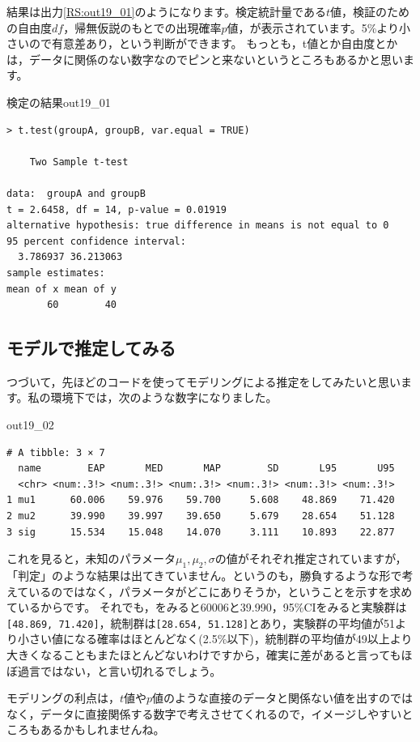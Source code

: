 \documentclass{ltjsbook}
\begin{document}
結果は出力\ref{RS:out19_01}のようになります。検定統計量である$t$値，検証のための自由度$df$，帰無仮説のもとでの出現確率$p$値，が表示されています。5\%より小さいので有意差あり，という判断ができます。
もっとも，t値とか自由度とかは，データに関係のない数字なのでピンと来ないというところもあるかと思います。
\begin{Rscreen}{検定の結果}{out19_01}
	\begin{verbatim}
> t.test(groupA, groupB, var.equal = TRUE)

	Two Sample t-test

data:  groupA and groupB
t = 2.6458, df = 14, p-value = 0.01919
alternative hypothesis: true difference in means is not equal to 0
95 percent confidence interval:
  3.786937 36.213063
sample estimates:
mean of x mean of y 
       60        40 
\end{verbatim}
\end{Rscreen}

\subsection{モデルで推定してみる}
つづいて，先ほどのコードを使ってモデリングによる推定をしてみたいと思います。私の環境下では，次のような数字になりました。

\begin{MCMCout}{}{out19_02}
	\begin{verbatim}
# A tibble: 3 × 7
  name        EAP       MED       MAP        SD       L95       U95
  <chr> <num:.3!> <num:.3!> <num:.3!> <num:.3!> <num:.3!> <num:.3!>
1 mu1      60.006    59.976    59.700     5.608    48.869    71.420
2 mu2      39.990    39.997    39.650     5.679    28.654    51.128
3 sig      15.534    15.048    14.070     3.111    10.893    22.877
\end{verbatim}
\end{MCMCout}
これを見ると，未知のパラメータ$\mu_1, \mu_2, \sigma$の値がそれぞれ推定されていますが，「判定」のような結果は出てきていません。というのも，勝負するような形で考えているのではなく，パラメータがどこにありそうか，ということを示すを求めているからです。
それでも，をみると60006と39.990，95\%CIをみると実験群は\verb|[48.869, 71.420]|，統制群は\verb|[28.654, 51.128]|とあり，実験群の平均値が51より小さい値になる確率はほとんどなく(2.5\%以下)，統制群の平均値が49以上より大きくなることもまたほとんどないわけですから，確実に差があると言ってもほぼ過言ではない，と言い切れるでしょう。

モデリングの利点は，$t$値や$p$値のような直接のデータと関係ない値を出すのではなく，データに直接関係する数字で考えさせてくれるので，イメージしやすいところもあるかもしれませんね。
\end{document}
